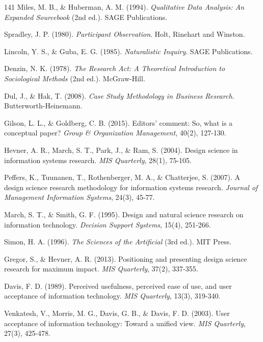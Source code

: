 \begin{thebibliography}{141}
Miles, M. B., \& Huberman, A. M. (1994). \textit{Qualitative Data Analysis: An Expanded Sourcebook} (2nd ed.). SAGE Publications.

Spradley, J. P. (1980). \textit{Participant Observation}. Holt, Rinehart and Winston.

Lincoln, Y. S., \& Guba, E. G. (1985). \textit{Naturalistic Inquiry}. SAGE Publications.

Denzin, N. K. (1978). \textit{The Research Act: A Theoretical Introduction to Sociological Methods} (2nd ed.). McGraw-Hill.

Dul, J., \& Hak, T. (2008). \textit{Case Study Methodology in Business Research}. Butterworth-Heinemann.

Gilson, L. L., \& Goldberg, C. B. (2015). Editors' comment: So, what is a conceptual paper? \textit{Group \& Organization Management}, 40(2), 127-130.


Hevner, A. R., March, S. T., Park, J., \& Ram, S. (2004). Design science in information systems research. \textit{MIS Quarterly}, 28(1), 75-105.

Peffers, K., Tuunanen, T., Rothenberger, M. A., \& Chatterjee, S. (2007). A design science research methodology for information systems research. \textit{Journal of Management Information Systems}, 24(3), 45-77.

March, S. T., \& Smith, G. F. (1995). Design and natural science research on information technology. \textit{Decision Support Systems}, 15(4), 251-266.

Simon, H. A. (1996). \textit{The Sciences of the Artificial} (3rd ed.). MIT Press.

Gregor, S., \& Hevner, A. R. (2013). Positioning and presenting design science research for maximum impact. \textit{MIS Quarterly}, 37(2), 337-355.


Davis, F. D. (1989). Perceived usefulness, perceived ease of use, and user acceptance of information technology. \textit{MIS Quarterly}, 13(3), 319-340.

Venkatesh, V., Morris, M. G., Davis, G. B., \& Davis, F. D. (2003). User acceptance of information technology: Toward a unified view. \textit{MIS Quarterly}, 27(3), 425-478.


\end{thebibliography}

